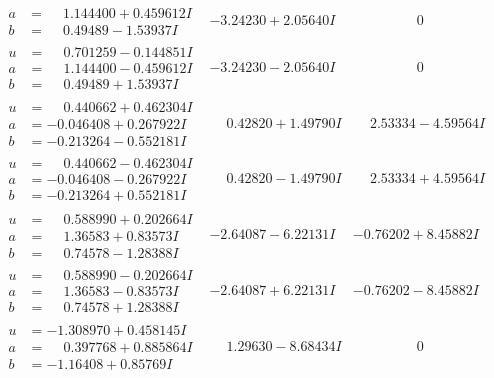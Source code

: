 \documentclass[1p]{elsarticle_modified}
\theoremstyle{definition}
\begin{document}
$$\begin{array}{c|c|c}
\begin{aligned}
a &= \phantom{-}1.144400 + 0.459612 I \\
b &= \phantom{-}0.49489 - 1.53937 I\end{aligned}
 & -3.24230 + 2.05640 I & \phantom{-0.000000 } 0 \\ \hline\begin{aligned}
u &= \phantom{-}0.701259 - 0.144851 I \\
a &= \phantom{-}1.144400 - 0.459612 I \\
b &= \phantom{-}0.49489 + 1.53937 I\end{aligned}
 & -3.24230 - 2.05640 I & \phantom{-0.000000 } 0 \\ \hline\begin{aligned}
u &= \phantom{-}0.440662 + 0.462304 I \\
a &= -0.046408 + 0.267922 I \\
b &= -0.213264 - 0.552181 I\end{aligned}
 & \phantom{-}0.42820 + 1.49790 I & \phantom{-}2.53334 - 4.59564 I \\ \hline\begin{aligned}
u &= \phantom{-}0.440662 - 0.462304 I \\
a &= -0.046408 - 0.267922 I \\
b &= -0.213264 + 0.552181 I\end{aligned}
 & \phantom{-}0.42820 - 1.49790 I & \phantom{-}2.53334 + 4.59564 I \\ \hline\begin{aligned}
u &= \phantom{-}0.588990 + 0.202664 I \\
a &= \phantom{-}1.36583 + 0.83573 I \\
b &= \phantom{-}0.74578 - 1.28388 I\end{aligned}
 & -2.64087 - 6.22131 I & -0.76202 + 8.45882 I \\ \hline\begin{aligned}
u &= \phantom{-}0.588990 - 0.202664 I \\
a &= \phantom{-}1.36583 - 0.83573 I \\
b &= \phantom{-}0.74578 + 1.28388 I\end{aligned}
 & -2.64087 + 6.22131 I & -0.76202 - 8.45882 I \\ \hline\begin{aligned}
u &= -1.308970 + 0.458145 I \\
a &= \phantom{-}0.397768 + 0.885864 I \\
b &= -1.16408 + 0.85769 I\end{aligned}
 & \phantom{-}1.29630 - 8.68434 I & \phantom{-0.000000 } 0 \\ \hline\begin{aligned}

\end{aligned}
\end{array}$$
\end{document}
